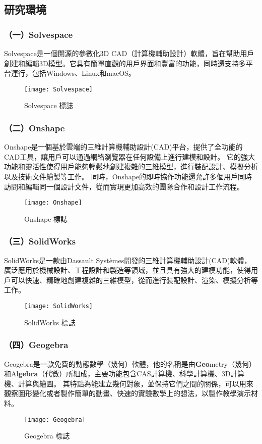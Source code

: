 \subsection{研究環境}

\subsubsection{（一）Solvespace}
\fontsize{14pt}{2.5pt}\sectionef\hspace{12pt}
Solvespace是一個開源的參數化3D CAD（計算機輔助設計）軟體，旨在幫助用戶創建和編輯3D模型。它具有簡單直觀的用戶界面和豐富的功能，同時還支持多平台運行，包括Windows、Linux和macOS。\\
\begin{figure}[hbt!]
\center
\texttt{[image: Solvespace]}
\caption{\Large Solvespace 標誌}
\end{figure}

\subsubsection{（二）Onshape}

Onshape是一個基於雲端的三維計算機輔助設計(CAD)平台，提供了全功能的CAD工具，讓用戶可以通過網絡瀏覽器在任何設備上進行建模和設計。
它的強大功能和靈活性使得用戶能夠輕鬆地創建複雜的三維模型，進行裝配設計、模擬分析以及技術文件繪製等工作。
同時，Onshape的即時協作功能還允許多個用戶同時訪問和編輯同一個設計文件，從而實現更加高效的團隊合作和設計工作流程。\\
\begin{figure}[hbt!]
\center
\texttt{[image: Onshape]}
\caption{\Large Onshape 標誌}
\end{figure}


\subsubsection{（三）SolidWorks}
SolidWorks是一款由Dassault Systèmes開發的三維計算機輔助設計(CAD)軟體，廣泛應用於機械設計、工程設計和製造等領域，並且具有強大的建模功能，使得用戶可以快速、精確地創建複雜的三維模型，從而進行裝配設計、渲染、模擬分析等工作。\\
\begin{figure}[hbt!]
\center
\texttt{[image: SolidWorks]}
\caption{\Large SolidWorks 標誌}
\end{figure}


\subsubsection{（四）Geogebra}
Geogebra是一款免費的動態數學（幾何）軟體，他的名稱是由\textbf{Geo}metry（幾何）和Al\textbf{gebra}（代數）所組成，主要功能包含CAS計算機、科學計算機、3D計算機、計算與繪圖。
其特點為能建立幾何對象，並保持它們之間的關係，可以用來觀察圖形變化或者製作簡單的動畫、快速的實驗數學上的想法，以製作教學演示材料。\\
\begin{figure}[hbt!]
\center
\texttt{[image: Geogebra]}
\caption{\Large Geogebra 標誌}
\end{figure}

